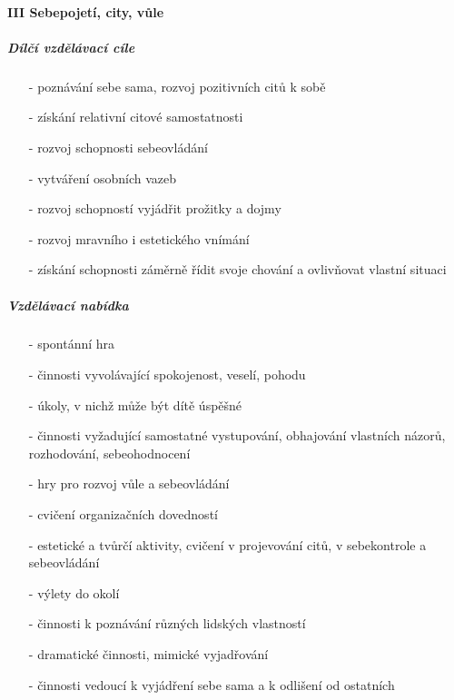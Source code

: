 				\paragraph{III Sebepojetí, city, vůle}
				
					\subparagraph{Dílčí vzdělávací cíle}

					\begin{itemize}
					\setlength\itemsep{-2mm}
						\item[-]poznávání sebe sama, rozvoj pozitivních citů k sobě
						\item[-]získání relativní citové samostatnosti
						\item[-]rozvoj schopnosti sebeovládání
						\item[-]vytváření osobních vazeb
						\item[-]rozvoj schopností vyjádřit prožitky a dojmy
						\item[-]rozvoj mravního i estetického vnímání
						\item[-]získání schopnosti záměrně řídit svoje chování a ovlivňovat vlastní situaci
					\end{itemize}

					\subparagraph{Vzdělávací nabídka}
					
					\begin{itemize}
					\setlength\itemsep{-2mm}
						\item[-]spontánní hra
						\item[-]činnosti vyvolávající spokojenost, veselí, pohodu
						\item[-]úkoly, v nichž může být dítě úspěšné
						\item[-]činnosti vyžadující samostatné vystupování, obhajování vlastních názorů, rozhodování, sebeohodnocení
						\item[-]hry pro rozvoj vůle a sebeovládání
						\item[-]cvičení organizačních dovedností
						\item[-]estetické a tvůrčí aktivity, cvičení v projevování citů, v sebekontrole a sebeovládání
						\item[-]výlety do okolí
						\item[-]činnosti k poznávání různých lidských vlastností
						\item[-]dramatické činnosti, mimické vyjadřování
						\item[-]činnosti vedoucí k vyjádření sebe sama a k odlišení od ostatních
					\end{itemize}
					

